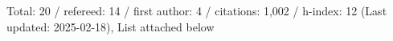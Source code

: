 Total: 20 / refereed: 14 / first author: 4 / citations: 1,002 / h-index: 12 (Last updated: 2025-02-18), List attached below